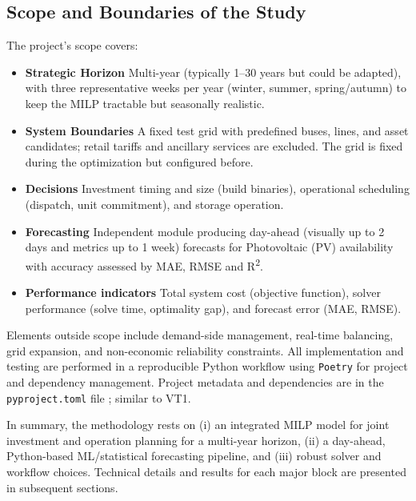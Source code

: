 \subsection{Scope and Boundaries of the Study}
The project’s scope covers:
\begin{itemize}
    \item \textbf{Strategic Horizon} Multi-year (typically 1--30 years but could be adapted), with three
    representative weeks per year (winter, summer, spring/autumn) to keep the MILP tractable but seasonally realistic.
    \item \textbf{System Boundaries} A fixed test grid with predefined buses, lines, and asset 
    candidates; retail tariffs and ancillary services are excluded. The grid is fixed during 
    the optimization but configured before.
    \item \textbf{Decisions} Investment timing and size (build binaries), operational scheduling 
    (dispatch, unit commitment), and storage operation.
    \item \textbf{Forecasting} Independent module producing day-ahead (visually up to 2 days and 
    metrics up to 1 week) forecasts for Photovoltaic (PV) availability with accuracy assessed by 
    MAE, RMSE and R\textsuperscript{2}.
    \item \textbf{Performance indicators} Total system cost (objective function), solver performance 
    (solve time, optimality gap), and forecast error (MAE, RMSE).
\end{itemize}

Elements outside scope include demand-side management, real-time balancing, grid expansion, and 
non-economic reliability constraints. All implementation and testing are performed in a reproducible 
Python workflow using \texttt{Poetry} for project and dependency management. Project metadata and 
dependencies are in the \texttt{pyproject.toml} file ; similar to VT1.

In summary, the methodology rests on (i) an integrated MILP model for joint investment and operation 
planning for a multi-year horizon, (ii) a day-ahead, Python-based ML/statistical forecasting pipeline, and (iii)
robust solver and workflow choices. Technical details and results for each major block are presented in 
subsequent sections.